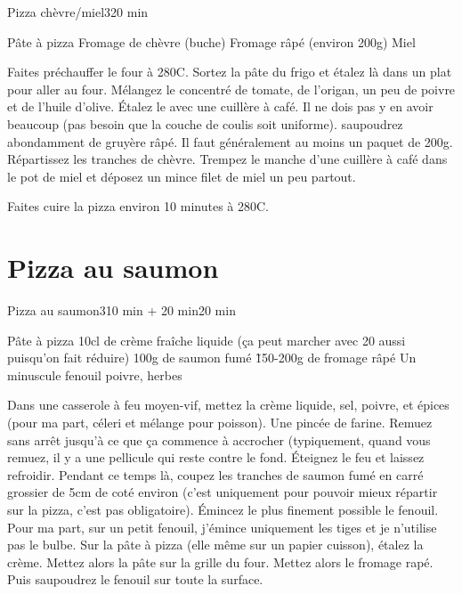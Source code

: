{\begin{recette}{Pizza chèvre/miel}{3}{}{20 min}
\begin{ingredients}
\ingredient Pâte à pizza
\ingredient Fromage de chèvre (buche)
\ingredient Fromage râpé (environ 200g)
\ingredient Miel
\end{ingredients}

\begin{preparation}
\etape Faites préchauffer le four à 280\degres C.
\etape Sortez la pâte du frigo et étalez là dans un plat pour aller au four.
\etape Mélangez le concentré de tomate, de l'origan, un peu de poivre et de l'huile d'olive.
\etape Étalez le avec une cuillère à café. Il ne dois pas y en avoir beaucoup (pas besoin que la couche de coulis soit 
uniforme).
\etape saupoudrez abondamment de gruyère râpé. Il faut généralement au moins un paquet de 200g. 
\etape Répartissez les tranches de chèvre. 
\etape Trempez le manche d'une cuillère à café dans le pot de miel et déposez un mince filet de miel un peu partout.
\end{preparation}

\begin{cuisson}
Faites cuire la pizza environ 10 minutes à 280\degres C.
\end{cuisson}
\end{recette}

\section{Pizza au saumon}
\begin{recette}{Pizza au saumon}{3}{10 min + 20 min}{20 min}
\begin{ingredients}
\ingredient Pâte à pizza
\ingredient 10cl de crème fraîche liquide (ça peut marcher avec 20 aussi puisqu'on fait réduire)
\ingredient 100g de saumon fumé
\ingredient \~ 150-200g de fromage râpé
\ingredient Un minuscule fenouil
\ingredient poivre, herbes
\end{ingredients}

\begin{preparation}
\etape Dans une casserole à feu moyen-vif, mettez la crème liquide, sel, poivre, et épices (pour ma part, céleri et mélange 
pour poisson). Une pincée de farine. Remuez sans arrêt jusqu'à ce que ça commence à accrocher (typiquement, quand vous remuez, 
il y a une pellicule qui reste contre le fond. Éteignez le feu et laissez refroidir.
\etape Pendant ce temps là, coupez les tranches de saumon fumé en carré grossier de 5cm de coté environ (c'est uniquement pour pouvoir mieux répartir sur la pizza, c'est pas obligatoire).
\etape Émincez le plus finement possible le fenouil. Pour ma part, sur un petit fenouil, j'émince uniquement les tiges et je 
n'utilise pas le bulbe. 
\etape Sur la pâte à pizza (elle même sur un papier cuisson), étalez la crème. Mettez alors la pâte sur la grille du four.
\etape Mettez alors le fromage rapé. Puis saupoudrez le fenouil sur toute la surface.
\end{preparation}


\end{recette}}
